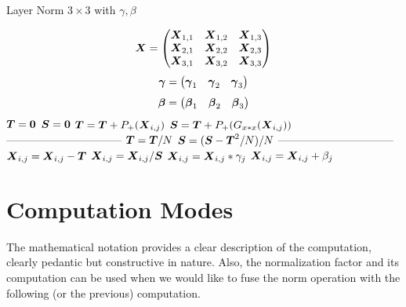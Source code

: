 \documentclass[acmsmall]{acmart}
\begin{document}
\begin{algorithm}
    \caption{Layer Norm $3\times 3$ with $\gamma, \beta$}
    \label{alg:l2_4}
    \begin{algorithmic}
      \STATE \[
        {\boldsymbol X}  =   \begin{pmatrix}
          {\boldsymbol X}_{1,1} &    {\boldsymbol X}_{1,2}&    {\boldsymbol X}_{1,3}  \\
          {\boldsymbol X}_{2,1} &    {\boldsymbol X}_{2,2}&    {\boldsymbol X}_{2,3}  \\
          {\boldsymbol X}_{3,1} &    {\boldsymbol X}_{3,2}&    {\boldsymbol X}_{3,3}  \\
        \end{pmatrix}
      \] 
      \STATE \[
        {\boldsymbol \gamma}  =   \begin{pmatrix}
          {\boldsymbol \gamma}_{1} &    {\boldsymbol \gamma}_{2}&    {\boldsymbol \gamma}_{3}  \\
        \end{pmatrix}
      \] 
      \STATE \[
        {\boldsymbol \beta}  =   \begin{pmatrix}
          {\boldsymbol \beta}_{1} &    {\boldsymbol \beta}_{2}&    {\boldsymbol \beta}_{3}  \\
        \end{pmatrix}
      \] 
          \STATE ${\boldsymbol T} = {\boldsymbol 0} $ 
          \STATE ${\boldsymbol S} = {\boldsymbol 0} $ 
              \STATE ${\boldsymbol T} = {\boldsymbol T} +P_+({\boldsymbol X}_{i,j})$               
              \STATE ${\boldsymbol S} = {\boldsymbol T} +P_+(G_{x*x}({\boldsymbol X}_{i,j}))$   
          \ENDWHILE
          \STATE --------------------------------     
          \STATE ${\boldsymbol T}  =   {\boldsymbol T}/N$       
          \STATE ${\boldsymbol S}  =   ({\boldsymbol S} - {\boldsymbol T}^2/N)/N$       
          \STATE --------------------------------     
             \STATE $ {\boldsymbol X}_{i,j} = {\boldsymbol X}_{i,j}-{\boldsymbol T}$  
             \STATE $ {\boldsymbol X}_{i,j} = {\boldsymbol X}_{i,j}/{\boldsymbol S}$   
             \STATE $ {\boldsymbol X}_{i,j} = {\boldsymbol X}_{i,j}*\gamma_j$   
             \STATE $ {\boldsymbol X}_{i,j} = {\boldsymbol X}_{i,j} + \beta_j$   
          \ENDWHILE
      \ENDWHILE
    \end{algorithmic}
\end{algorithm}


\section{Computation Modes} 
The mathematical notation provides a clear description of the
computation, clearly pedantic but constructive in nature. Also, the
normalization factor and its computation can be used when we would
like to fuse the norm operation with the following (or the previous)
computation.
\end{document}
